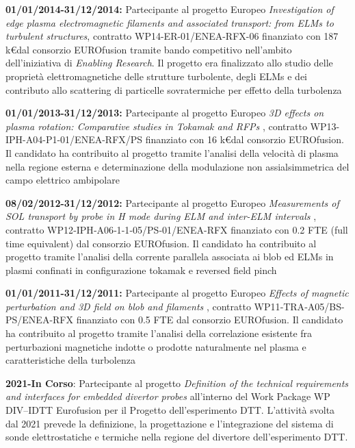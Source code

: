 \begin{enumerate}[label={[G\arabic*]}]
\item \textbf{01/01/2014-31/12/2014:} Partecipante al progetto Europeo
  \emph{Investigation of edge plasma electromagnetic filaments and
    associated transport: from ELMs to turbulent structures},
  contratto WP14-ER-01/ENEA-RFX-06 finanziato con 187 k\euro dal
  consorzio EUROfusion tramite bando competitivo nell'ambito
  dell'iniziativa di \emph{Enabling Research}. Il progetto era
  finalizzato allo studio delle proprietà elettromagnetiche delle
  strutture turbolente, degli ELMs e dei contributo allo scattering di
  particelle sovratermiche per effetto della turbolenza
\item \textbf{01/01/2013-31/12/2013:} Partecipante al progetto Europeo
  \emph{3D effects on plasma rotation: Comparative
    studies in Tokamak and RFPs }, contratto
  WP13-IPH-A04-P1-01/ENEA-RFX/PS finanziato con 16 k\euro dal
  consorzio EUROfusion. Il candidato ha contribuito al progetto
  tramite l'analisi della velocità di plasma nella regione esterna e
  determinazione della modulazione non assialsimmetrica del campo
  elettrico ambipolare
\item \textbf{08/02/2012-31/12/2012:} Partecipante al progetto Europeo
  \emph{Measurements of SOL transport by probe in H mode during ELM
    and inter-ELM intervals }, contratto
  WP12‐IPH‐A06‐1‐1‐05/PS‐01/ENEA-RFX finanziato con 0.2 FTE (full time
  equivalent) dal
  consorzio EUROfusion. Il candidato ha contribuito al progetto
  tramite l'analisi della corrente parallela associata ai blob ed ELMs
  in plasmi confinati in configurazione tokamak e reversed field pinch
%
 \item \textbf{01/01/2011-31/12/2011:} Partecipante al progetto Europeo
  \emph{Effects of magnetic perturbation and 3D field on blob and filaments }, contratto
  WP11‐TRA‐A05/BS-PS/ENEA-RFX finanziato con 0.5 FTE  dal
  consorzio EUROfusion. Il candidato ha contribuito al progetto
  tramite l'analisi della correlazione esistente fra perturbazioni
  magnetiche indotte o
  prodotte naturalmente nel plasma e caratteristiche della turbolenza

 \item \textbf{2021-In Corso}: Partecipante al progetto
   \emph{Definition of the technical requirements and interfaces for
     embedded divertor probes}  all’interno del Work Package
   WP DIV–IDTT Eurofusion per il Progetto dell’esperimento DTT.
   L’attività svolta dal 2021 prevede la definizione, la progettazione
   e l’integrazione del sistema di sonde elettrostatiche e termiche
   nella regione
   del divertore dell’esperimento DTT.

   
\end{enumerate}

